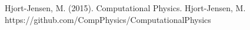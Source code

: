\documentclass[twoside,twocolumn]{article}
\begin{document}
\begin{thebibliography}{99} %
Hjort-Jensen, M. (2015).
\newblock Computational Physics.
Hjort-Jensen, M.
\newblock https://github.com/CompPhysics/ComputationalPhysics

 
\end{thebibliography}

\end{document}

